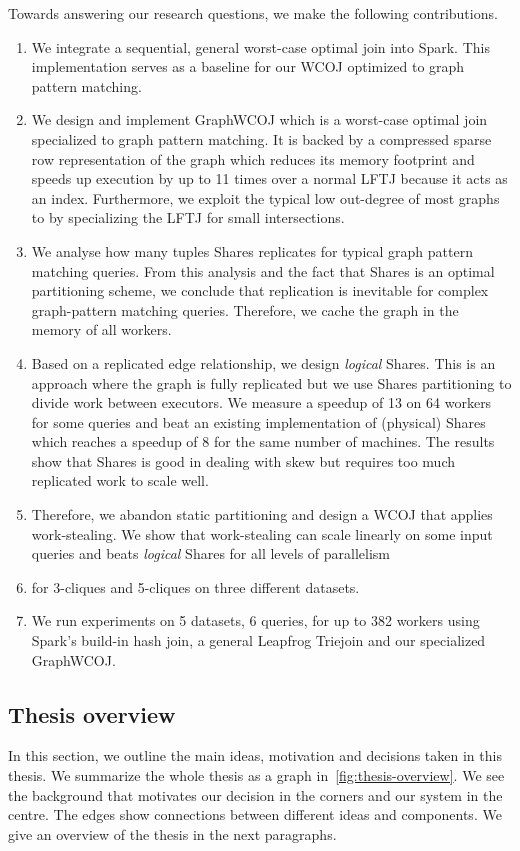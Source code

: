Towards answering our research questions, we make the following contributions.
\begin{enumerate}
    \item We integrate a sequential, general worst-case optimal join into Spark.
    This implementation serves as a baseline for our \textsc{WCOJ} optimized to graph pattern matching.
    \item We design and implement GraphWCOJ which is a worst-case optimal join specialized to graph pattern matching.
    It is backed by a compressed sparse row representation of the graph which reduces its memory footprint and speeds up execution by up
    to 11 times over a normal \textsc{LFTJ} because it acts as an index. %
    Furthermore, we exploit the typical low out-degree of most graphs to by specializing the \textsc{LFTJ} for small intersections.
    \item We analyse how many tuples Shares replicates for typical graph pattern matching queries.
    From this analysis and the fact that Shares is an optimal partitioning scheme, we conclude that replication is inevitable for complex
    graph-pattern matching queries.
    Therefore, we cache the graph in the memory of all workers.
    \item Based on a replicated edge relationship, we design \textit{logical} Shares.
    This is an approach where the graph is fully replicated but we use Shares partitioning to divide work between executors.
    We measure a speedup of 13 on 64 workers for some queries and beat an existing implementation of (physical) Shares which reaches
    a speedup of 8 for the same number of machines.
    The results show that Shares is good in dealing with skew but requires too much replicated work to scale well.
    \item Therefore, we abandon static partitioning and design a \textsc{WCOJ} that applies work-stealing.
    We show that work-stealing can scale linearly on some input queries and beats \textit{logical} Shares for all levels of parallelism
    \item for 3-cliques and 5-cliques on three different datasets.
    \item We run experiments on 5 datasets, 6 queries, for up to 382 workers using Spark's build-in hash join,
    a general Leapfrog Triejoin and our specialized GraphWCOJ.
\end{enumerate}

\subsection{Thesis overview} \label{subsec:thesis-idea}
In this section, we outline the main ideas, motivation and decisions taken in this thesis.
We summarize the whole thesis as a graph in~\cref{fig:thesis-overview}.
We see the background that motivates our decision in the corners and our system in the centre.
The edges show connections between different ideas and components.
We give an overview of the thesis in the next paragraphs.

